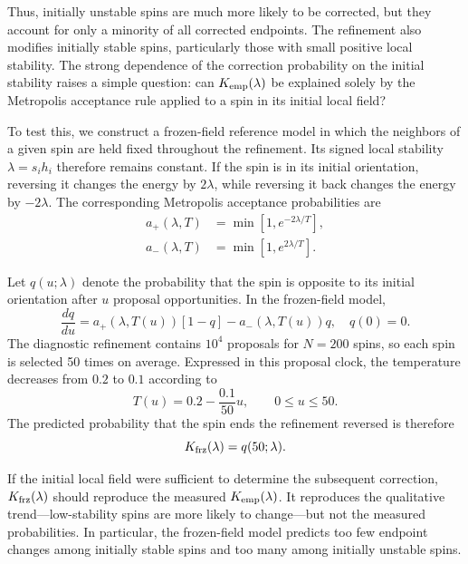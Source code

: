 \documentclass[
reprint,
amsmath,amssymb,
aps,
pre,
floatfix,
]{revtex4-2}
\begin{document}
Thus, initially unstable spins are much more likely to be corrected, but
they account for only a minority of all corrected endpoints. The refinement
also modifies initially stable spins, particularly those with small positive
local stability.
The strong dependence of the correction probability on the initial
stability raises a simple question: can
$K_{\rm emp}(\lambda)$ be explained solely by the Metropolis acceptance
rule applied to a spin in its initial local field?

To test this, we construct a frozen-field reference model in which the
neighbors of a given spin are held fixed throughout the refinement.
Its signed local stability $\lambda=s_i h_i$ therefore remains constant.
If the spin is in its initial orientation, reversing it changes the energy
by $2\lambda$, while reversing it back changes the energy by $-2\lambda$.
The corresponding Metropolis acceptance probabilities are
\begin{align}
a_{+}(\lambda,T)
&=
\min\!\left[1,e^{-2\lambda/T}\right],\\
a_{-}(\lambda,T)
&=
\min\!\left[1,e^{2\lambda/T}\right].
\end{align}

Let $q(u;\lambda)$ denote the probability that the spin is opposite to its
initial orientation after $u$ proposal opportunities. In the frozen-field
model,
\begin{equation}
\frac{dq}{du}
=
a_{+}(\lambda,T(u))[1-q]
-
a_{-}(\lambda,T(u))q,
\quad q(0)=0 .
\label{eq:frozen_field_ode}
\end{equation}
The diagnostic refinement contains $10^4$ proposals for $N=200$ spins, so
each spin is selected 50 times on average. Expressed in this proposal clock,
the temperature decreases from $0.2$ to $0.1$ according to
\begin{equation}
T(u)=0.2-\frac{0.1}{50}u,
\qquad 0\leq u\leq50 .
\end{equation}
The predicted probability that the spin ends the refinement reversed is
therefore
\begin{equation}
K_{\rm frz}(\lambda)=q(50;\lambda).
\end{equation}

If the initial local field were sufficient to determine the subsequent
correction, $K_{\rm frz}(\lambda)$ should reproduce the measured
$K_{\rm emp}(\lambda)$. It reproduces the qualitative trend---low-stability
spins are more likely to change---but not the measured probabilities.
In particular, the frozen-field model predicts too few endpoint changes
among initially stable spins and too many among initially unstable spins.
\end{document}
